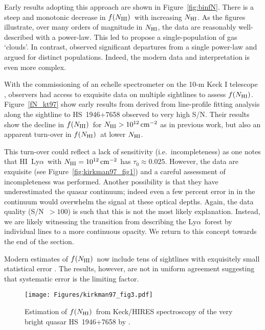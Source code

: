 \documentclass[graybox]{svmult}
\newcommand{\HI}{H{\sc I}}
\def\lya{Ly$\alpha$}
\newcommand{\mnhi}{N_{\rm HI}}
\newcommand{\nhi}{$\mnhi$}
\def\cm#1{\, {\rm cm^{#1}}}
\def\mfnhi{f(\mnhi)}
\def\fnhi{$\mfnhi$}
\begin{document}
Early results adopting this approach are shown in 
Figure~\ref{fig:binfN}.  There is a steep and monotonic
decrease in \fnhi\ with increasing \nhi.  As the figures
illustrate, over many orders of magnitude in \nhi, the
data are reasonably  well-described with a power-law.
This led \cite{tytler87}
to propose a single-population of gas `clouds'.
In contrast, \cite{petitjean93} observed significant
departures from a single power-law and 
argued for distinct populations. Indeed, the
modern data and interpretation is even more complex.

With the commissioning of an echelle spectrometer on
the 10-m Keck I telescope \cite[HIRES]{vogt94}, 
observers had access to exquisite data on multiple 
sightlines to assess \fnhi.  Figure~\ref{fN_kt97}
show early results from \cite{kt97} derived from
line-profile fitting analysis along the sightline
to HS~1946+7658 observed to very high S/N.  
Their results show the decline in \fnhi\ for
$\mnhi > 10^{12} \cm{-2}$ as in previous work, but 
also an apparent turn-over in \fnhi\ at lower \nhi. 

This turn-over could reflect a lack of sensitivity 
(i.e.\ incompleteness) as one notes that \HI\ \lya\
with  $\mnhi = 10^{12} \cm{-2}$ has $\tau_0 \approx 0.025$.
However, the data are exquisite (see Figure~\ref{fig:kirkman97_fig1})
and a careful assessment of incompleteness was performed.
Another possibility is that they have underestimated the
quasar continuum; indeed even a few percent error in
in the continuum would overwhelm the signal at these
optical depths.  Again, the data quality (S/N~$>100$)
is such that this is not the most likely explanation.
Instead, we are likely witnessing the transition from
describing the \lya\ forest by individual lines to 
a more continuous opacity.  We return to this concept
towards the end of the section.

Modern estimates of \fnhi\ now include tens of sightlines
with exquisitely small statistical error \cite{rudie13,kim13}.
The results, however, are not in uniform agreement suggesting
that systematic error is the limiting factor.



%
\begin{figure}[b]
\sidecaption
\texttt{[image: Figures/kirkman97\_fig3.pdf]}
%
%
\caption{Estimation of \fnhi\ from Keck/HIRES spectroscopy of the
very bright quasar HS~1946+7658 by \cite{kt97}.
}
\label{fig:fN_kt97}       %
\end{figure}
\end{document}
